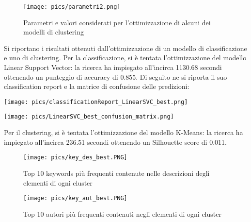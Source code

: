 \documentclass[12pt,oneside]{article}
\begin{document}
        \begin{figure}[H]
        \texttt{[image: pics/parametri2.png]}
        \captionsetup{width=0.70\textwidth, justification=centering}
        \caption{Parametri e valori considerati per l’ottimizzazione di alcuni dei modelli di clustering}
        \end{figure}
        
        \begin{justify}
        Si riportano i risultati ottenuti dall’ottimizzazione di un modello di classificazione e uno di clustering.
        Per la classificazione, si è tentata l’ottimizzazione del modello Linear Support Vector: la ricerca ha impiegato all’incirca 1130.68 secondi ottenendo un punteggio di accuracy di 0.855. Di seguito ne si riporta il suo classification report e la matrice di confusione delle predizioni:
        \end{justify}

        \centering
        \texttt{[image: pics/classificationReport\_LinearSVC\_best.png]}
        
        \texttt{[image: pics/LinearSVC\_best\_confusion\_matrix.png]}
        
        \begin{justify}
        Per il clustering, si è tentata l’ottimizzazione del modello K-Means: la ricerca ha impiegato all’incirca 236.51 secondi ottenendo un Silhouette score di 0.011.
        \end{justify}

        \begin{figure}[H]
        \texttt{[image: pics/key\_des\_best.PNG]}
        \captionsetup{width=0.70\textwidth, justification=centering}
        \caption{Top 10 keywords più frequenti contenute nelle descrizioni degli elementi di ogni cluster}
        \end{figure}

        \begin{figure}[H]
        \texttt{[image: pics/key\_aut\_best.PNG]}
        \captionsetup{width=0.70\textwidth, justification=centering}
        \caption{Top 10 autori più frequenti contenuti negli elementi di ogni cluster}
        \end{figure}
\end{document}
